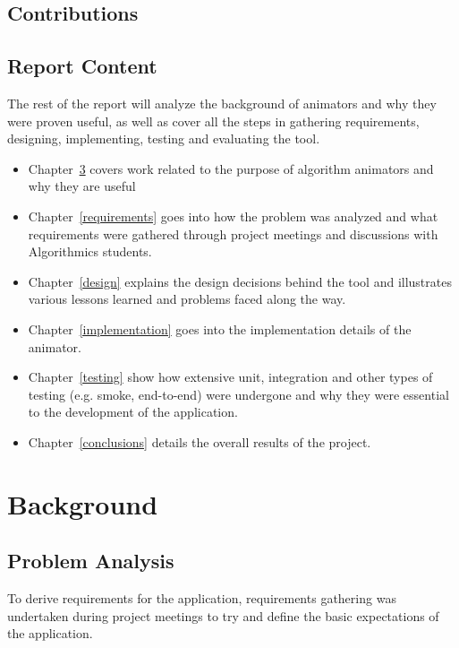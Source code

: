 \documentclass{l4proj}
\begin{document}
\section{Contributions}


\section{Report Content}
The rest of the report will analyze the background of animators and why they were proven useful, as well as cover all the steps in gathering requirements, designing, implementing, testing and evaluating the tool. 

\begin{itemize}
\item Chapter~\ref{background} covers work related to the purpose of algorithm animators and why they are useful 
\item Chapter~\ref{requirements} goes into how the problem was analyzed and what requirements were gathered through
	project meetings and discussions with Algorithmics students.
\item Chapter~\ref{design} explains the design decisions behind the tool and illustrates various lessons learned and
	problems faced along the way.
\item Chapter~\ref{implementation} goes into the implementation details of the animator.
\item Chapter~\ref{testing} show how extensive unit, integration and other types of testing (e.g. smoke, end-to-end)
	were undergone and why they were essential to the development of the application.
\item Chapter~\ref{conclusions} details the overall results of the project.
\end{itemize}


\chapter{Background}
\label{background}
\section{Problem Analysis}
To derive requirements for the application, requirements gathering was undertaken during project meetings to try and define the basic 
expectations of the application.
\end{document}
